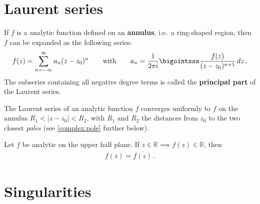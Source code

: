 \section{Laurent series}

    \begin{definition}\label{complex:laurent_series}
        If $f$ is a analytic function defined on an \textbf{annulus}, i.e.~a ring-shaped region, then $f$ can be expanded as the following series:
        \begin{gather}
            f(z) = \sum^\infty_{n=-\infty}a_n(z-z_0)^n \qquad\text{with}\qquad a_n = \frac{1}{2\pi i}\bigointsss\frac{f(z)}{(z-z_0)^{n+1}}\,dz\,.
        \end{gather}
        The subseries containing all negative degree terms is called the \textbf{principal part} of the Laurent series.
    \end{definition}

    \begin{property}
        The Laurent series of an analytic function $f$ converges uniformly to $f$ on the annulus $R_1 < |z-z_0| < R_2$, with $R_1$ and $R_2$ the distances from $z_0$ to the two closest \textit{poles} (see \cref{complex:pole} further below).
    \end{property}


    \begin{theorem}
        Let $f$ be analytic on the upper half plane. If $z\in\mathbb{R}\implies f(z)\in\mathbb{R}$, then
        \begin{gather}
            f(\overline{z}) = \overline{f(z)}\,.
        \end{gather}
    \end{theorem}

\section{Singularities}
